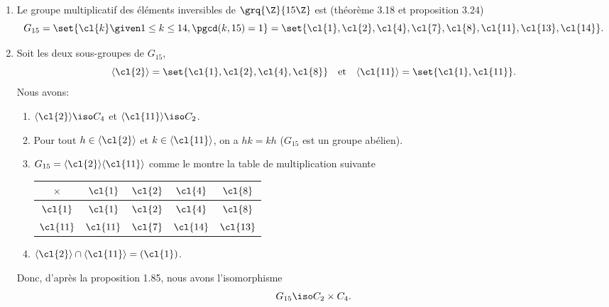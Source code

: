\begin{enumerate}
  \item
    Le groupe multiplicatif des éléments inversibles de $\grq{\Z}{15\Z}$ est
    (théorème 3.18 et proposition 3.24)
    \[
      G_{15}
        = \set{\cl{k} \given 1\leq k\leq 14, \pgcd(k,15)=1}
        = \set{
            \cl{1},\cl{2},\cl{4},\cl{7},\cl{8},\cl{11},\cl{13},\cl{14}
          }.
    \]
  \item
    Soit les deux sous-groupes de $G_{15}$,
    \[
      \langle\cl{2}\rangle = \set{\cl{1},\cl{2},\cl{4},\cl{8}}
      \quad\text{et}\quad
      \langle\cl{11}\rangle = \set{\cl{1},\cl{11}}.
    \]
    Nous avons:

    \begin{enumerate}[1)]
      \item
        $\langle\cl{2}\rangle \iso C_4$ et $\langle\cl{11}\rangle \iso C_2$.
      \item
        Pour tout $h\in\langle\cl{2}\rangle$ et $k\in\langle\cl{11}\rangle$, on
        a $hk = kh$ ($G_{15}$ est un groupe abélien).
      \item
        $G_{15} = \langle\cl{2}\rangle \langle\cl{11}\rangle$ comme le montre la
        table de multiplication suivante

        \begin{center}
          \begin{tabular}{c|cccc}
            $\times$  & $\cl{1}$  & $\cl{2}$ & $\cl{4}$  & $\cl{8}$ \\
            \midrule
            $\cl{1}$  & $\cl{1}$  & $\cl{2}$ & $\cl{4}$  & $\cl{8}$ \\
            $\cl{11}$ & $\cl{11}$ & $\cl{7}$ & $\cl{14}$ & $\cl{13}$
          \end{tabular}
        \end{center}

      \item
        $\langle\cl{2}\rangle \cap \langle\cl{11}\rangle = (\cl{1})$.
    \end{enumerate}

    Donc, d'après la proposition 1.85, nous avons l'isomorphisme
    \[
      G_{15} \iso C_2 \times C_4.
    \]
\end{enumerate}
